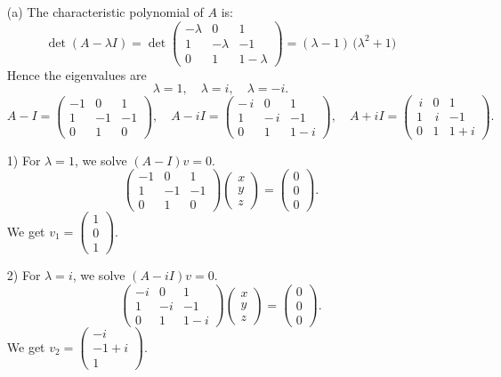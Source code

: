 \documentclass{article}
\begin{document}
\begin{itemize}
    \item[(a)]
    The characteristic polynomial of \(A\) is:
\[
\det(A - \lambda I)
= \det\!
\begin{pmatrix}
-\lambda & 0 & 1\\
1 & -\lambda & -1\\
0 & 1 & 1-\lambda
\end{pmatrix} = (\lambda - 1)\,\bigl(\lambda^2 + 1\bigr)
\]
Hence the eigenvalues are
\[
\lambda = 1,\quad \lambda = i,\quad \lambda = -i.
\]
\[
A - I = 
\begin{pmatrix}
-1 & 0 & 1\\
1 & -1 & -1\\
0 & 1 & 0
\end{pmatrix},
\quad
A - iI =
\begin{pmatrix}
-\,i & 0 & 1\\
1 & -\,i & -1\\
0 & 1 & 1 - i
\end{pmatrix},
\quad
A + iI =
\begin{pmatrix}
\,i & 0 & 1\\
1 & \,i & -1\\
0 & 1 & 1 + i
\end{pmatrix}.
\]

1) For \(\lambda = 1\), we solve \((A - I)v = 0\). 
\[
\begin{pmatrix}
-1 & 0 & 1\\
1 & -1 & -1\\
0 & 1 & 0
\end{pmatrix}
\begin{pmatrix}
x \\ y \\ z
\end{pmatrix}
= 
\begin{pmatrix}
0 \\ 0 \\ 0
\end{pmatrix}.
\]
We get $v_1 = \begin{pmatrix}1 \\ 0 \\ 1\end{pmatrix}.$

2) For \(\lambda = i\), we solve \((A - iI)v = 0\).
\[
\begin{pmatrix}
-i & 0 & 1\\
1 & -i & -1\\
0 & 1 & 1-i
\end{pmatrix}
\begin{pmatrix}
x \\ y \\ z
\end{pmatrix}
= 
\begin{pmatrix}
0 \\ 0 \\ 0
\end{pmatrix}.
\]
We get $v_2 = \begin{pmatrix}-i \\ -1+i \\ 1\end{pmatrix}$.


\end{itemize}
\end{document}

